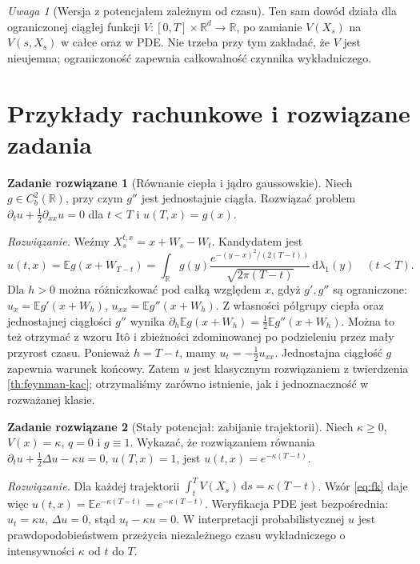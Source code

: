 \documentclass[11pt,a4paper,oneside]{report}
\numberwithin{equation}{chapter}
\theoremstyle{plain}
\theoremstyle{definition}
\newtheorem{zadanie}{Zadanie rozwiązane}[chapter]
\theoremstyle{remark}
\newtheorem{uwaga}{Uwaga}[chapter]
\newcommand{\R}{\mathbb{R}}
\newcommand{\E}{\mathbb{E}}
\newcommand{\dd}{\mathrm{d}}
\begin{document}
\begin{uwaga}[Wersja z potencjałem zależnym od czasu]
Ten sam dowód działa dla ograniczonej ciągłej funkcji
$V:[0,T]\times\R^d\to\R$, po zamianie
$V(X_s)$ na $V(s,X_s)$ w całce oraz w PDE.
Nie trzeba przy tym zakładać, że $V$ jest nieujemna;
ograniczoność zapewnia całkowalność czynnika wykładniczego.
\end{uwaga}

\section{Przykłady rachunkowe i rozwiązane zadania}

\begin{zadanie}[Równanie ciepła i jądro gaussowskie]
Niech $g\in C_b^2(\R)$, przy czym $g''$ jest
jednostajnie ciągła. Rozwiązać problem
$\partial_tu+\frac12\partial_{xx}u=0$ dla $t<T$
i $u(T,x)=g(x)$.

\emph{Rozwiązanie.} Weźmy $X_s^{t,x}=x+W_s-W_t$.
Kandydatem jest
\[
u(t,x)=\E g(x+W_{T-t})
=\int_\R g(y)\frac{e^{-(y-x)^2/(2(T-t))}}
{\sqrt{2\pi(T-t)}}\,\dd\lambda_1(y)
\quad(t<T).
\]
Dla $h>0$ można różniczkować pod całką względem $x$,
gdyż $g',g''$ są ograniczone: $u_x=\E g'(x+W_h)$,
$u_{xx}=\E g''(x+W_h)$.
Z własności półgrupy ciepła oraz jednostajnej ciągłości
$g''$ wynika
$\partial_h\E g(x+W_h)=\frac12\E g''(x+W_h)$.
Można to też otrzymać z wzoru Itô i zbieżności
zdominowanej po podzieleniu przez mały przyrost czasu.
Ponieważ $h=T-t$, mamy $u_t=-\frac12u_{xx}$.
Jednostajna ciągłość $g$ zapewnia warunek końcowy.
Zatem $u$ jest klasycznym rozwiązaniem z twierdzenia
\ref{th:feynman-kac}; otrzymaliśmy zarówno istnienie,
jak i jednoznaczność w rozważanej klasie.
\end{zadanie}

\begin{zadanie}[Stały potencjał: zabijanie trajektorii]
Niech $\kappa\ge0$, $V(x)=\kappa$, $q=0$ i $g\equiv1$.
Wykazać, że rozwiązaniem równania
$\partial_tu+\frac12\Delta u-\kappa u=0$,
$u(T,x)=1$, jest $u(t,x)=e^{-\kappa(T-t)}$.

\emph{Rozwiązanie.} Dla każdej trajektorii
$\int_t^TV(X_s)\,\dd s=\kappa(T-t)$.
Wzór \eqref{eq:fk} daje więc
$u(t,x)=\E e^{-\kappa(T-t)}=e^{-\kappa(T-t)}$.
Weryfikacja PDE jest bezpośrednia:
$u_t=\kappa u$, $\Delta u=0$, stąd
$u_t-\kappa u=0$. W interpretacji probabilistycznej
$u$ jest prawdopodobieństwem przeżycia niezależnego
czasu wykładniczego o intensywności $\kappa$ od $t$ do $T$.
\end{zadanie}
\end{document}
